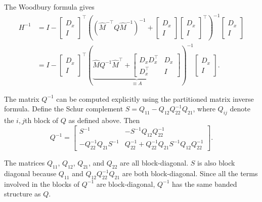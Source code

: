 \documentclass{article}
\begin{document}
The Woodbury formula gives
\begin{align}
    H^{-1} & = I -
    \begin{bmatrix}
        D_x \\ I
    \end{bmatrix}
    ^\top
    \left( \left(\hat{M}^{-\top} Q \hat{M}^{-1}\right)^{-1} +
    \begin{bmatrix}
        D_x \\ I
    \end{bmatrix}
    \begin{bmatrix}
        D_x \\ I
    \end{bmatrix}
    ^\top
    \right)^{-1}
    \begin{bmatrix}
        D_x \\ I
    \end{bmatrix}
    \nonumber      \\
    & = I -
    \begin{bmatrix}
        D_x \\ I
    \end{bmatrix}
    ^\top
    \left(\underbrace{
        \hat{M} Q^{-1} \hat{M}^\top
        +
        \begin{bmatrix}
            D_x D_x^\top & D_x \\
            D_x^\top     & I
        \end{bmatrix}
    }_{\equiv A}\right)^{-1}
    \begin{bmatrix}
        D_x \\ I
    \end{bmatrix}
    .
\end{align}

The matrix $Q^{-1}$ can be computed explicitly using the partitioned matrix inverse formula. Define the Schur
complement $S = Q_{11} - Q_{12} Q_{22}^{-1} Q_{21}$, where $Q_{ij}$ denote the $i,j$th block of $Q$ as defined above.
Then
\begin{equation}
    Q^{-1} =
    \begin{bmatrix}
        S^{-1}                      & -S^{-1} Q_{12} Q_{22}^{-1}                                 \\
        - Q_{22}^{-1} Q_{21} S^{-1} & Q_{22}^{-1} + Q_{22}^{-1} Q_{21} S^{-1} Q_{12} Q_{22}^{-1}
    \end{bmatrix}
    .
\end{equation}

The matrices $Q_{11}$, $Q_{12}$, $Q_{21}$, and $Q_{22}$ are all block-diagonal. $S$ is also block diagonal because
$Q_{11}$ and $Q_{12} Q_{22}^{-1} Q_{21}$ are both block-diagonal. Since all the terms involved in the blocks of
$Q^{-1}$ are block-diagonal, $Q^{-1}$ has the same banded structure as $Q$.
\end{document}
